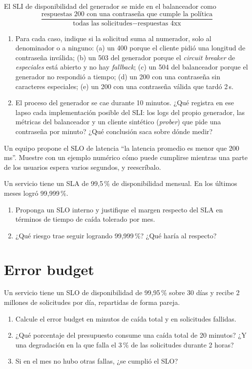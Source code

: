 \documentclass[variant=guia,cover=institutional,mode=screen]{ua-engineering-v6-article}
\begin{document}
\begin{uaexercise}
El SLI de disponibilidad del generador se mide en el balanceador como
\[
\frac{\text{respuestas 200 con una contraseña que cumple la política}}{\text{todas las solicitudes} - \text{respuestas 4xx}}
\]
\begin{enumerate}
\item Para cada caso, indique si la solicitud suma al numerador, solo al denominador o a ninguno: (a) un 400 porque el cliente pidió una longitud de contraseña inválida; (b) un 503 del generador porque el \emph{circuit breaker} de \emph{especiales} está abierto y no hay \emph{fallback}; (c) un 504 del balanceador porque el generador no respondió a tiempo; (d) un 200 con una contraseña sin caracteres especiales; (e) un 200 con una contraseña válida que tardó 2\,s.
\item El proceso del generador se cae durante 10 minutos. ¿Qué registra en ese lapso cada implementación posible del SLI: los logs del propio generador, las métricas del balanceador y un cliente sintético (\emph{prober}) que pide una contraseña por minuto? ¿Qué conclusión saca sobre dónde medir?
\end{enumerate}
\end{uaexercise}

\begin{uaexercise}
Un equipo propone el SLO de latencia ``la latencia promedio es menor que 200\,ms''. Muestre con un ejemplo numérico cómo puede cumplirse mientras una parte de los usuarios espera varios segundos, y reescríbalo.
\end{uaexercise}

\begin{uaexercise}
Un servicio tiene un SLA de 99,5\,\% de disponibilidad mensual. En los últimos meses logró 99,999\,\%.
\begin{enumerate}
\item Proponga un SLO interno y justifique el margen respecto del SLA en términos de tiempo de caída tolerado por mes.
\item ¿Qué riesgo trae seguir logrando 99,999\,\%? ¿Qué haría al respecto?
\end{enumerate}
\end{uaexercise}


\section{Error budget}
\begin{uaexercise}
Un servicio tiene un SLO de disponibilidad de 99,95\,\% sobre 30 días y recibe 2 millones de solicitudes por día, repartidas de forma pareja.
\begin{enumerate}
\item Calcule el error budget en minutos de caída total y en solicitudes fallidas.
\item ¿Qué porcentaje del presupuesto consume una caída total de 20 minutos? ¿Y una degradación en la que falla el 3\,\% de las solicitudes durante 2 horas?
\item Si en el mes no hubo otras fallas, ¿se cumplió el SLO?
\end{enumerate}
\end{uaexercise}
\end{document}
